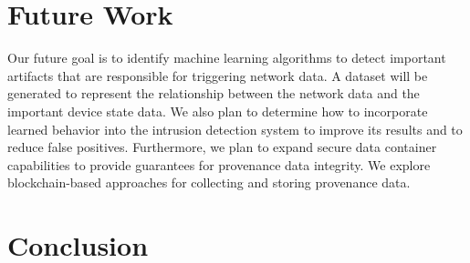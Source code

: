 \documentclass[conference]{IEEEtran}
\begin{document}
\section{Future Work}
Our future goal is to identify machine learning algorithms to detect important artifacts that are responsible for triggering network data. A dataset will be generated to represent the relationship between the network data and the important device state data. We also plan to determine how to incorporate learned behavior into the intrusion detection system to improve its results and to reduce false positives. Furthermore, we plan to expand secure data container capabilities to provide guarantees for provenance data integrity. We explore blockchain-based approaches for collecting and storing provenance data.   

\section{Conclusion}
\end{document}
